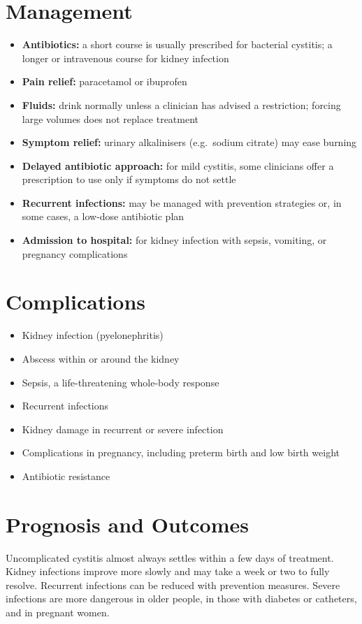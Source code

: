 \section*{Management}
\begin{itemize}
    \item \textbf{Antibiotics:} a short course is usually prescribed for bacterial cystitis; a longer or intravenous course for kidney infection
    \item \textbf{Pain relief:} paracetamol or ibuprofen
    \item \textbf{Fluids:} drink normally unless a clinician has advised a restriction; forcing large volumes does not replace treatment
    \item \textbf{Symptom relief:} urinary alkalinisers (e.g.\ sodium citrate) may ease burning
    \item \textbf{Delayed antibiotic approach:} for mild cystitis, some clinicians offer a prescription to use only if symptoms do not settle
    \item \textbf{Recurrent infections:} may be managed with prevention strategies or, in some cases, a low-dose antibiotic plan
    \item \textbf{Admission to hospital:} for kidney infection with sepsis, vomiting, or pregnancy complications
\end{itemize}

\section*{Complications}
\begin{itemize}
    \item Kidney infection (pyelonephritis)
    \item Abscess within or around the kidney
    \item Sepsis, a life-threatening whole-body response
    \item Recurrent infections
    \item Kidney damage in recurrent or severe infection
    \item Complications in pregnancy, including preterm birth and low birth weight
    \item Antibiotic resistance
\end{itemize}

\section*{Prognosis and Outcomes}
Uncomplicated cystitis almost always settles within a few days of treatment. Kidney infections improve more slowly and may take a week or two to fully resolve. Recurrent infections can be reduced with prevention measures. Severe infections are more dangerous in older people, in those with diabetes or catheters, and in pregnant women.

